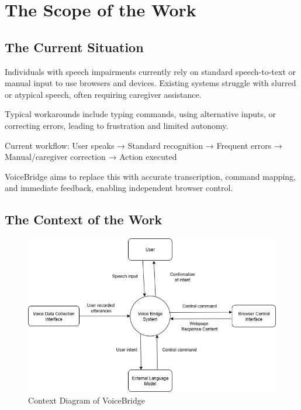 \documentclass[11pt]{article}
\begin{document}
\section{The Scope of the Work}
\subsection{The Current Situation}

Individuals with speech impairments currently rely on standard speech-to-text or manual input to use browsers and devices. Existing systems struggle with slurred or atypical speech, often requiring caregiver assistance.

Typical workarounds include typing commands, using alternative inputs, or correcting errors, leading to frustration and limited autonomy.

Current workflow:
User speaks → Standard recognition → Frequent errors → Manual/caregiver correction → Action executed

VoiceBridge aims to replace this with accurate transcription, command mapping, and immediate feedback, enabling independent browser control.

\subsection{The Context of the Work}

\begin{figure}[H]
\centering
\includegraphics[width=1\textwidth]{../imgs/VoiceBridge_context_diagram.png}
\caption{Context Diagram of VoiceBridge}
\label{fig:voicebridge-context}
\end{figure}
\end{document}

